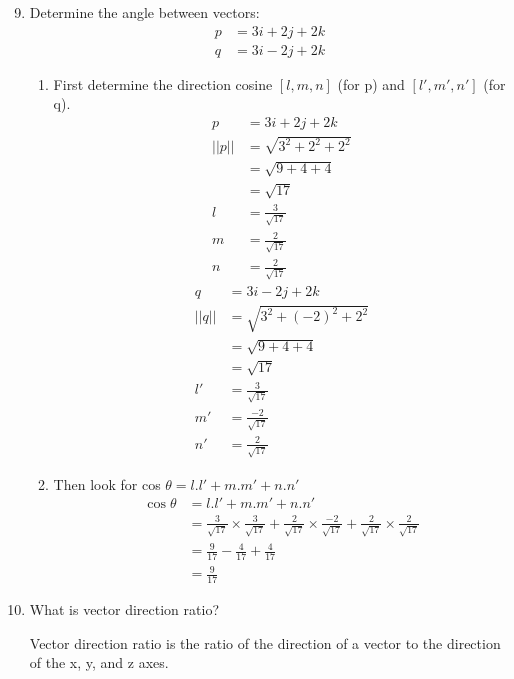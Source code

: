 \documentclass[12pt,titlepage]{article}
\begin{document}
\begin{enumerate}
    \setcounter{enumi}{8}
    \item {
        Determine the angle between vectors:
        \begin{align*}
            p &= 3i + 2j + 2k\\
            q &= 3i - 2j + 2k
        \end{align*}
        \begin{enumerate}
            \item {
                First determine the direction cosine $[l, m, n]$ (for p) and $[l', m', n']$ (for q).
                \begin{align*}
                    p &= 3i + 2j + 2k \\
                    ||p|| &= \sqrt{3^2 + 2^2 + 2^2} \\
                    &= \sqrt{9 + 4 + 4} \\
                    &= \sqrt{17} \\
                    l &= \frac{3}{\sqrt{17}} \\
                    m &= \frac{2}{\sqrt{17}} \\
                    n &= \frac{2}{\sqrt{17}}
                \end{align*}
                \begin{align*}
                    q &= 3i - 2j + 2k \\
                    ||q|| &= \sqrt{3^2 + (-2)^2 + 2^2} \\
                    &= \sqrt{9 + 4 + 4} \\
                    &= \sqrt{17} \\
                    l' &= \frac{3}{\sqrt{17}} \\
                    m' &= \frac{-2}{\sqrt{17}} \\
                    n' &= \frac{2}{\sqrt{17}}
                \end{align*}
            }
            \item {
                Then look for cos $\theta = l.l' + m.m' + n.n'$
                \begin{align*}
                    \cos\theta &= l.l' + m.m' + n.n' \\
                    &= \frac{3}{\sqrt{17}} \times \frac{3}{\sqrt{17}} + \frac{2}{\sqrt{17}} \times \frac{-2}{\sqrt{17}} + \frac{2}{\sqrt{17}} \times \frac{2}{\sqrt{17}} \\
                    &= \frac{9}{17} - \frac{4}{17} + \frac{4}{17} \\
                    &= \frac{9}{17}
                \end{align*}
            }
        \end{enumerate}
    }
    \item {
        What is vector direction ratio?

        Vector direction ratio is the ratio of the direction of a vector to the direction of the x, y, and z axes.
    }
\end{enumerate}
\end{document}
